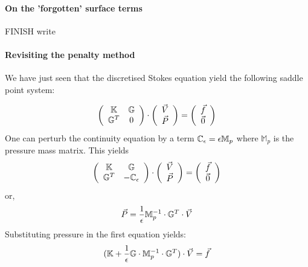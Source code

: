 





\paragraph{On the 'forgotten' surface terms}

FINISH write

\paragraph{Revisiting the penalty method}

We have just seen that the discretised Stokes equation yield the 
following saddle point system:


\[
\left( \begin{array}{cc}
{\mathbb{K}} & {\mathbb{G}}  \\ 
{\mathbb{G}}^T & 0 
\end{array} \right) \cdot
\left( \begin{array}{c}  \vec{V} \\ \vec{P}  \end{array} \right) = 
\left( \begin{array}{c}  \vec{f} \\ \vec{0}  \end{array} \right) 
\]
One can perturb the continuity equation 
by a term ${\mathbb{C}}_\epsilon = \epsilon \mathbb{M}_p$
where $\mathbb{M}_p$ is the pressure mass matrix.
This yields
\[
\left( \begin{array}{cc}
{\mathbb{K}} & {\mathbb{G}}  \\ {\mathbb{G}}^T & -\mathbb{C}_\epsilon
\end{array} \right) \cdot
\left( \begin{array}{c}  \vec{V} \\ \vec{P}  \end{array} \right) = 
\left( \begin{array}{c}  \vec{f} \\ \vec{0}  \end{array} \right) 
\]
or,
\[
\vec{P}= \frac{1}{\epsilon} \mathbb{M}_p^{-1} \cdot  {\mathbb{G}}^T \cdot \vec{V}
\]
Substituting pressure in the first equation yields:
\begin{equation}
({\mathbb{K}} + \frac{1}{\epsilon} {\mathbb{G}} \cdot \mathbb{M}_p^{-1} \cdot {\mathbb{G}}^T ) \cdot \vec{V} = \vec{f} 
\label{eqdpf}
\end{equation}

